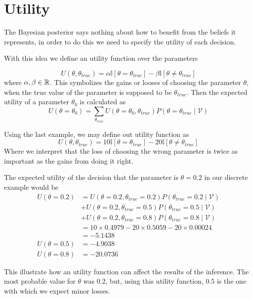 \section{Utility}

The Bayesian posterior says nothing about how to benefit from the beliefs it
represents, in order to do this we need to specify the utility of each decision.

With this idea we define an utility function over the parameters

\[
  U(\theta, \theta_{true}) = \alpha \mathbb{I}[\theta = \theta_{true}] - \beta
  \mathbb{I}[\theta \neq \theta_{true}]
\]
where \(\alpha, \beta \in \mathbb{R}\). This symbolizes the gains or looses of choosing
the parameter \(\theta\), when the true value of the parameter is supposed to be
\(\theta_{true}\). Then the expected utility of a parameter \(\theta_0\) is
calculated as
\[
  U(\theta = \theta_0) = \sum_{\theta_{true}}U(\theta = \theta_0,
  \theta_{true})P(\theta = \theta_{true}  \mid  \mathcal{V})
\]

Using the last example, we may define out utility function as
\[
  U(\theta, \theta_{true}) = 10\mathbb{I}[\theta = \theta_{true}] - 20
  \mathbb{I}[\theta \neq \theta_{true}]
\]
Where we interpret that the loss of choosing the wrong parameter is twice as
important as the gains from doing it right.

The expected utility of the decision that the parameter is \(\theta = 0.2\)
in our discrete example would be
\[
  \begin{aligned}
  U(\theta = 0.2) &= U(\theta = 0.2, \theta_{true} = 0.2)P(\theta_{true} = 0.2  \mid
  \mathcal{V})\\
  &+ U(\theta = 0.2, \theta_{true} = 0.5)P(\theta_{true} = 0.5  \mid
  \mathcal{V}) \\
  & +  U(\theta = 0.2, \theta_{true} = 0.8)P(\theta_{true} = 0.8  \mid  \mathcal{V})\\
  &= 10 \times 0.4979 - 20\times 0.5059 -20 \times 0.00024 \\
  &= -5.1438\\
  U(\theta = 0.5) &= -4.9038 \\
  U(\theta = 0.8) &= -20.0736
\end{aligned}
\]
 

This illustrate how an utility function can affect the results of the inference.
The most probable value for \(\theta\) was \(0.2\), but, using this utility
function, \(0.5\) is the one with which we expect minor losses.

